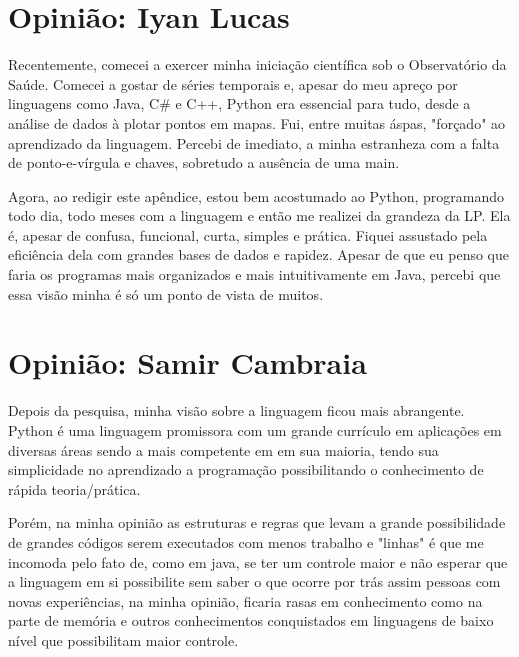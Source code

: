 \begin{apendicesenv}
\chapter{Opinião: Iyan Lucas}
\label{chap:apendiceB}

Recentemente, comecei a exercer minha iniciação científica sob o Observatório da Saúde. 
Comecei a gostar de séries temporais e, apesar do meu apreço por linguagens como Java, C\# e C++, Python era essencial para tudo, desde a análise de dados à plotar pontos em mapas.
Fui, entre muitas áspas, "forçado" ao aprendizado da linguagem. 
Percebi de imediato, a minha estranheza com a falta de ponto-e-vírgula e chaves, sobretudo a ausência de uma main.
\par Agora, ao redigir este apêndice, estou bem acostumado ao Python, programando todo dia, todo meses com a linguagem e então me realizei da grandeza da LP.
Ela é, apesar de confusa, funcional, curta, simples e prática.
Fiquei assustado pela eficiência dela com grandes bases de dados e rapidez.
Apesar de que eu penso que faria os programas mais organizados e mais intuitivamente em Java, percebi que essa visão minha é só um ponto de vista de muitos.

\chapter{Opinião: Samir Cambraia}
\label{chap:apendiceB}

Depois da pesquisa, minha visão sobre a linguagem ficou mais abrangente.
Python é uma linguagem promissora com um grande currículo em aplicações em diversas áreas sendo a mais competente em em sua maioria, tendo sua simplicidade no aprendizado a programação possibilitando o conhecimento de rápida teoria/prática.
\par Porém, na minha opinião as estruturas e regras que levam a grande possibilidade de grandes códigos serem executados com menos trabalho e "linhas" é que me incomoda pelo fato de, como em java, se ter um controle maior e não esperar que a linguagem em si possibilite sem saber o que ocorre por trás assim pessoas com novas experiências, na minha opinião, ficaria rasas em conhecimento como na parte de memória e outros conhecimentos conquistados em linguagens de baixo nível que possibilitam maior controle.


\end{apendicesenv}
